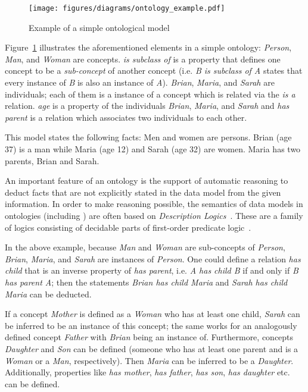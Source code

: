\vspace{1em}

\begin{figure}
\centering
\texttt{[image: figures/diagrams/ontology\_example.pdf]}
\caption{Example of a simple ontological model}
\label{fig:ontology_example}
\end{figure}

Figure~\ref{fig:ontology_example} illustrates the aforementioned elements in a simple ontology: \emph{Person}, \emph{Man}, and \emph{Woman} are concepts. \emph{is subclass of} is a property that defines one concept to be a \emph{sub-concept} of another concept (i.e. \emph{B is subclass of A} states that every instance of \emph{B} is also an instance of \emph{A}). \emph{Brian}, \emph{Maria}, and \emph{Sarah} are individuals; each of them is a instance of a concept which is related via the \emph{is a} relation. \emph{age} is a property of the individuals \emph{Brian}, \emph{Maria}, and \emph{Sarah} and \emph{has parent} is a relation which associates two individuals to each other.

This model states the following facts: Men and women are persons. Brian (age 37) is a man while Maria (age 12) and Sarah (age 32) are women. Maria has two parents, Brian and Sarah.

\vspace{1em}

An important feature of an ontology is the support of automatic reasoning to deduct facts that are not explicitly stated in the data model from the given information. In order to make reasoning possible, the semantics of data models in ontologies (including ) are often based on \emph{Description Logics}~\cite{OWL,SROIQ}. These are a family of logics consisting of decidable parts of first-order predicate logic~\cite{FirstOrderLogic}.

In the above example, because \emph{Man} and \emph{Woman} are sub-concepts of \emph{Person}, \emph{Brian}, \emph{Maria}, and \emph{Sarah} are instances of \emph{Person}. One could define a relation \emph{has child} that is an inverse property of \emph{has parent}, i.e. \emph{A has child B} if and only if \emph{B has parent A}; then the statements \emph{Brian has child Maria} and \emph{Sarah has child Maria} can be deducted.

If a concept \emph{Mother} is defined as a \emph{Woman} who has at least one child, \emph{Sarah} can be inferred to be an instance of this concept; the same works for an analogously defined concept \emph{Father} with \emph{Brian} being an instance of. Furthermore, concepts \emph{Daughter} and \emph{Son} can be defined (someone who has at least one parent and is a \emph{Woman} or a \emph{Man}, respectively). Then \emph{Maria} can be inferred to be a \emph{Daughter}. Additionally, properties like \emph{has mother}, \emph{has father}, \emph{has son}, \emph{has daughter} etc. can be defined.

